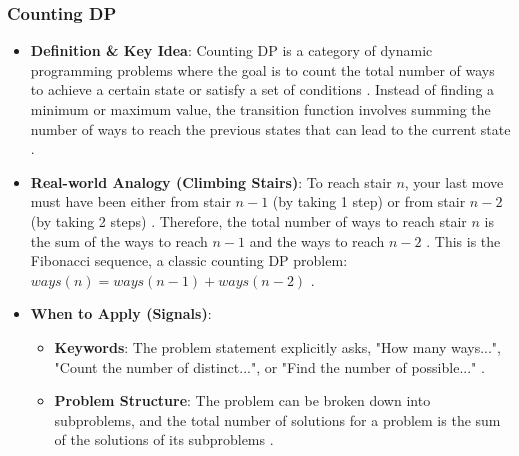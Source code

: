 \documentclass{article}
\begin{document}
\subsubsection{Counting DP}
\begin{itemize}
\item \textbf{Definition \& Key Idea}: Counting DP is a category of dynamic programming problems where the goal is to count the total number of ways to achieve a certain state or satisfy a set of conditions \cite{871}. Instead of finding a minimum or maximum value, the transition function involves summing the number of ways to reach the previous states that can lead to the current state \cite{872}.
\item \textbf{Real-world Analogy (Climbing Stairs)}: To reach stair $n$, your last move must have been either from stair $n-1$ (by taking 1 step) or from stair $n-2$ (by taking 2 steps) \cite{875}. Therefore, the total number of ways to reach stair $n$ is the sum of the ways to reach $n-1$ and the ways to reach $n-2$ \cite{876}. This is the Fibonacci sequence, a classic counting DP problem: $ways(n) = ways(n-1) + ways(n-2)$ \cite{877}.
\item \textbf{When to Apply (Signals)}:
\begin{itemize}
\item \textbf{Keywords}: The problem statement explicitly asks, "How many ways...", "Count the number of distinct...", or "Find the number of possible..." \cite{880}.
\item \textbf{Problem Structure}: The problem can be broken down into subproblems, and the total number of solutions for a problem is the sum of the solutions of its subproblems \cite{882}.
\end{itemize}
\end{itemize}
\end{document}
